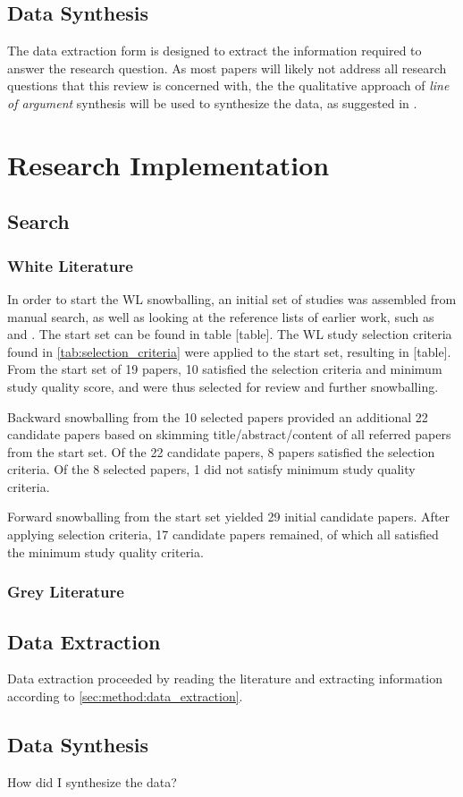 \subsection{Data Synthesis}
The data extraction form is designed to extract the information required to answer the research question.
As most papers will likely not address all research questions that this review is concerned with, the the qualitative approach of \textit{line of argument} synthesis will be used to synthesize the data, as suggested in \cite{Kitchenham07guidelinesfor}.

\section{Research Implementation}
\label{sec:research_implementation}

\subsection{Search}
\subsubsection{White Literature}
In order to start the WL snowballing, an initial set of studies was assembled from manual search, as well as looking at the reference lists of earlier work, such as \cite{John2021} and \cite{MartinezFernandez2021}.
The start set can be found in table [table].
The WL study selection criteria found in \cref{tab:selection_criteria} were applied to the start set, resulting in [table].
From the start set of 19 papers, 10 satisfied the selection criteria and minimum study quality score, and were thus selected for review and further snowballing.

Backward snowballing from the 10 selected papers provided an additional 22 candidate papers based on skimming title/abstract/content of all referred papers from the start set.
Of the 22 candidate papers, 8 papers satisfied the selection criteria.
Of the 8 selected papers, 1 did not satisfy minimum study quality criteria.

Forward snowballing from the start set yielded 29 initial candidate papers.
After applying selection criteria, 17 candidate papers remained, of which all satisfied the minimum study quality criteria.

\subsubsection{Grey Literature}

\subsection{Data Extraction}
Data extraction proceeded by reading the literature and extracting information according to \cref{sec:method:data_extraction}.

\subsection{Data Synthesis}
How did I synthesize the data?
